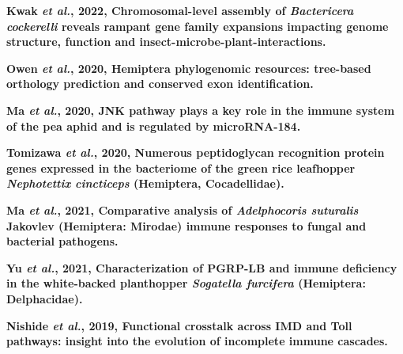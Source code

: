 \documentclass[11pt]{article}
\begin{document}
\begin{sloppypar}
\par
\textbf{Kwak \textit{et al.}, 2022, Chromosomal-level assembly of \textit{Bactericera cockerelli} reveals rampant gene family expansions impacting genome structure, function and insect-microbe-plant-interactions.} \newline
\par
\textbf{Owen \textit{et al.}, 2020, Hemiptera phylogenomic resources: tree-based orthology prediction and conserved exon identification.} \newline
\par
\textbf{Ma \textit{et al.}, 2020, JNK pathway plays a key role in the immune system of the pea aphid and is regulated by microRNA-184.} \newline
\par
\textbf{Tomizawa \textit{et al.}, 2020, Numerous peptidoglycan recognition protein genes expressed in the bacteriome of the green rice leafhopper \textit{Nephotettix cincticeps} (Hemiptera, Cocadellidae).} \newline
\par
\textbf{Ma \textit{et al.}, 2021, Comparative analysis of \textit{Adelphocoris suturalis} Jakovlev (Hemiptera: Mirodae) immune responses to fungal and bacterial pathogens.} \newline
\par
\textbf{Yu \textit{et al.}, 2021, Characterization of PGRP-LB and immune deficiency in the white-backed planthopper \textit{Sogatella furcifera} (Hemiptera: Delphacidae).} \newline
\par
\textbf{Nishide \textit{et al.}, 2019, Functional crosstalk across IMD and Toll pathways: insight into the evolution of incomplete immune cascades.}
\end{sloppypar}
\end{document}
